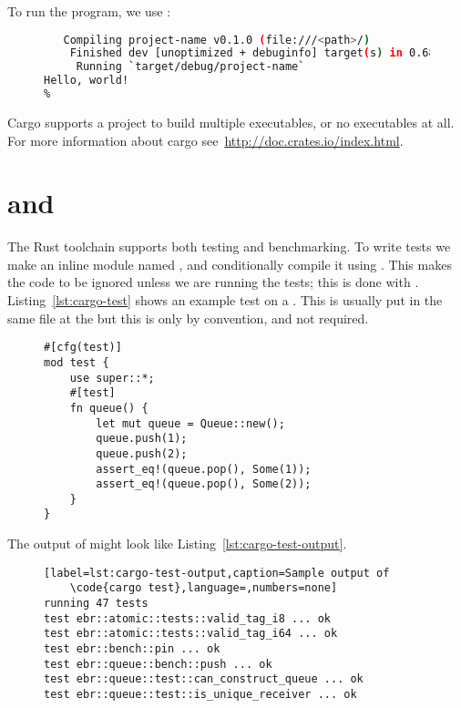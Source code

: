 \documentclass[b5paper]{report}
\begin{document}
\begin{appendices}
  To run the program, we use \cargo{}:
  \begin{figure}[ht]
  \begin{lstlisting}[language=Bash,numbers=none]
% cargo run
   Compiling project-name v0.1.0 (file:///<path>/)
    Finished dev [unoptimized + debuginfo] target(s) in 0.68 secs
     Running `target/debug/project-name`
Hello, world!
%
  \end{lstlisting}
\end{figure}

  Cargo supports a project to build multiple executables, or no executables at all.
  For more information about cargo see~\url{http://doc.crates.io/index.html}.

  \section{\code{\#[test]} and \code{\#[bench]}}
  \label{sec:rust-test}
  The Rust toolchain supports both testing and benchmarking. To write tests we
  make an inline module named , and conditionally compile it using
  . This makes the code to be ignored unless we are running
  the tests; this is done with . Listing~\ref{lst:cargo-test}
  shows an example test on a . This is usually put in the same file
  at the  but this is only by convention, and not required.

  \begin{figure}[ht!]
  \begin{lstlisting}[label=lst:cargo-test,caption=An example test in Rust]
#[cfg(test)]
mod test {
    use super::*;
    #[test]
    fn queue() {
        let mut queue = Queue::new();
        queue.push(1);
        queue.push(2);
        assert_eq!(queue.pop(), Some(1));
        assert_eq!(queue.pop(), Some(2));
    }
}
    \end{lstlisting}
  \end{figure}
  The output of  might look like
  Listing~\ref{lst:cargo-test-output}.
  \begin{figure}[ht!]
    \begin{lstlisting}[label=lst:cargo-test-output,caption=Sample output of
    \code{cargo test},language=,numbers=none]
running 47 tests
test ebr::atomic::tests::valid_tag_i8 ... ok
test ebr::atomic::tests::valid_tag_i64 ... ok
test ebr::bench::pin ... ok
test ebr::queue::bench::push ... ok
test ebr::queue::test::can_construct_queue ... ok
test ebr::queue::test::is_unique_receiver ... ok
    \end{lstlisting}
  \end{figure}


\end{appendices}
\end{document}
